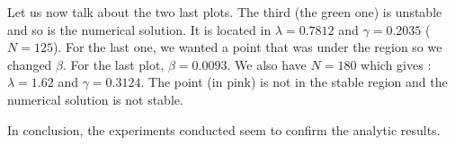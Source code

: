 Let us now talk about the two last plots. The third (the green one) is unstable and so is the numerical solution. It is located in $\lambda = 0.7812$ and $\gamma = 0.2035$ ($N=125$). For the last one, we wanted a point that was under the region so we changed $\beta$. For the last plot, $\beta = 0.0093$. We also have $N=180$ which gives : $\lambda = 1.62$ and $\gamma = 0.3124$. The point (in pink) is not in the stable region and the numerical solution is not stable.

In conclusion, the experiments conducted seem to confirm the analytic results.

